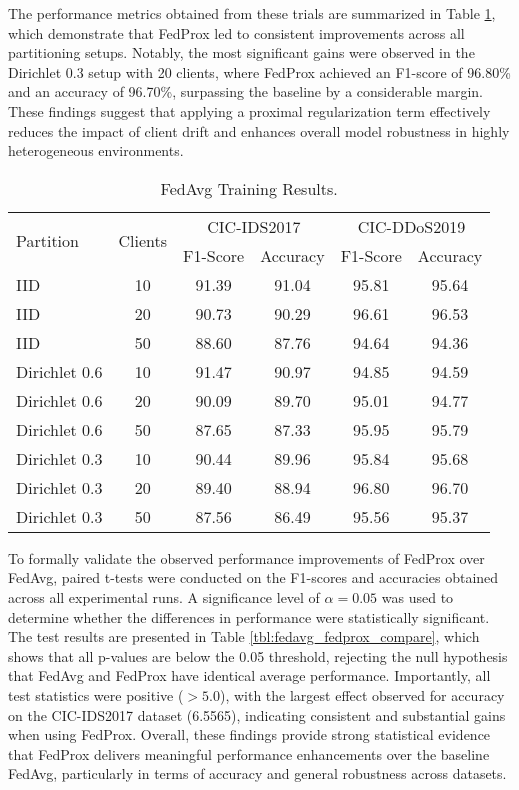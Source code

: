 The performance metrics obtained from these trials are summarized in Table \ref{tbl:fedprox_results}, which demonstrate that FedProx led to consistent improvements across all partitioning setups. Notably, the most significant gains were observed in the Dirichlet 0.3 setup with 20 clients, where FedProx achieved an F1-score of 96.80\% and an accuracy of 96.70\%, surpassing the baseline by a considerable margin. These findings suggest that applying a proximal regularization term effectively reduces the impact of client drift and enhances overall model robustness in highly heterogeneous environments.


\begin{table}[h]
    \caption{FedAvg Training Results.}
    \centering
    \begin{tabular}{l|c|c|c|c|c}
        \multirow{2}{*}{Partition} & \multirow{2}{*}{Clients} & \multicolumn{2}{|c|}{CIC-IDS2017} & \multicolumn{2}{|c}{CIC-DDoS2019} \\
        \cline{3-6} & & F1-Score & Accuracy & F1-Score & Accuracy \\
        \hline\hline
        IID & 10 & 91.39 & 91.04 & 95.81 & 95.64 \\
        IID & 20 & 90.73 & 90.29 & 96.61 & 96.53 \\
        IID & 50 & 88.60 & 87.76 & 94.64 & 94.36 \\
        Dirichlet 0.6 & 10 & 91.47 & 90.97 & 94.85 & 94.59 \\
        Dirichlet 0.6 & 20 & 90.09 & 89.70 & 95.01 & 94.77 \\
        Dirichlet 0.6 & 50 & 87.65 & 87.33 & 95.95 & 95.79 \\
        Dirichlet 0.3 & 10 & 90.44 & 89.96 & 95.84 & 95.68 \\
        Dirichlet 0.3 & 20 & 89.40 & 88.94 & 96.80 & 96.70 \\
        Dirichlet 0.3 & 50 & 87.56 & 86.49 & 95.56 & 95.37 \\
    \end{tabular}
    \label{tbl:fedprox_results}
\end{table}

To formally validate the observed performance improvements of FedProx over FedAvg, paired t-tests were conducted on the F1-scores and accuracies obtained across all experimental runs. A significance level of $\alpha=0.05$ was used to determine whether the differences in performance were statistically significant. The test results are presented in Table \ref{tbl:fedavg_fedprox_compare}, which shows that all p-values are below the 0.05 threshold, rejecting the null hypothesis that FedAvg and FedProx have identical average performance. Importantly, all test statistics were positive ($>5.0$), with the largest effect observed for accuracy on the CIC-IDS2017 dataset (6.5565), indicating consistent and substantial gains when using FedProx. Overall, these findings provide strong statistical evidence that FedProx delivers meaningful performance enhancements over the baseline FedAvg, particularly in terms of accuracy and general robustness across datasets.

